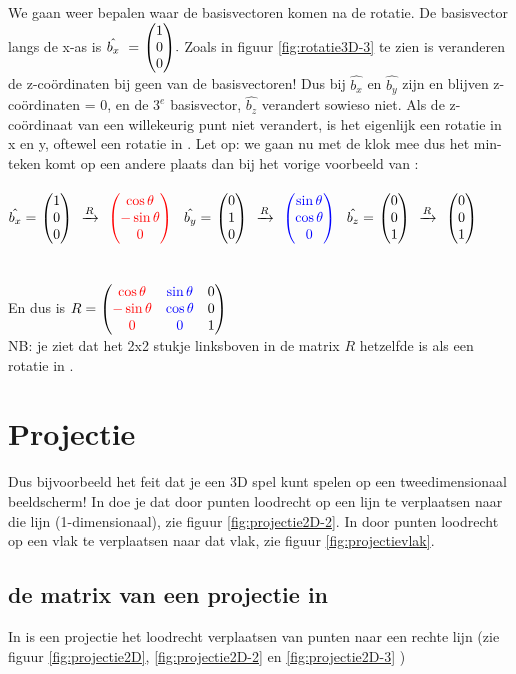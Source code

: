 \documentclass[hidelinks, a4wide, 12pt,  twoside]{book}
\begin{document}
We gaan weer bepalen waar de basisvectoren komen na de rotatie. De basisvector langs de x-as is $  \hat{b_x} \ = \ \vecdrie{1}{0}{0}. $ Zoals in figuur \ref{fig:rotatie3D-3} te zien is veranderen de z-coördinaten bij geen van de basisvectoren! Dus bij  $ \hat{b_x} $ en $  \hat{b_y} $  zijn en blijven z-coördinaten = 0, en de $ 3^e $ basisvector, $  \hat{b_z} $  verandert sowieso niet. Als de z-coördinaat van een willekeurig punt niet verandert, is het eigenlijk een rotatie in x en y, oftewel een rotatie in \RT.  Let op: we gaan nu met de klok mee dus het min-teken komt op een andere plaats dan bij het vorige voorbeeld van \RT: \\ \\
$ \hat{b_x}  = \ \vecdrie{1}{0}{0}  \ \  \xrightarrow{R} \ \  \vecdrie[red]{\cos \theta}{- \sin \theta}{0}\ $  
\qquad  $ \hat{b_y}  = \ \vecdrie{0}{1}{0}  \ \  \xrightarrow{R}  \ \ \vecdrie[blue]{\sin \theta}{ \cos \theta}{0}\ $  
\qquad  $ \hat{b_z}  = \ \vecdrie{0}{0}{1}   \  \  \xrightarrow{R}  \ \ \vecdrie{0}{0}{1}\ $  \\ \\ \\
En dus is $ R = 
\begin{pmatrix} {\color{red}\cos \theta} & {\color{blue}\sin \theta} & {0}  \\ {\color{red}- \sin \theta} & {\color{blue}\cos \theta} & {0} \\ {\color{red}0} & {\color{blue}0} & {1} \end{pmatrix} $ \\ NB: je ziet dat het 2x2 stukje linksboven in de matrix $ R $ hetzelfde is als  een rotatie in \RT.

\section{Projectie}		
  Dus bijvoorbeeld het feit dat je een 3D spel kunt spelen op een tweedimensionaal beeldscherm! In \RT doe je dat door punten loodrecht op een lijn te verplaatsen naar die lijn (1-dimensionaal), zie figuur \ref{fig:projectie2D-2}. In \RD door punten loodrecht op een vlak te verplaatsen naar dat vlak, zie figuur \ref{fig:projectievlak}.
\subsection{de matrix van een projectie in \RT}
\label{projectie2D}
In \RT is een projectie  het loodrecht verplaatsen van punten   naar een rechte lijn (zie figuur \ref{fig:projectie2D},  \ref{fig:projectie2D-2} en \ref{fig:projectie2D-3} ) \\ 
\end{document}
